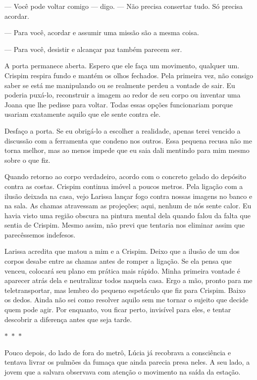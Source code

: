— Você pode voltar comigo — digo. — Não precisa consertar tudo. Só precisa acordar.

— Para você, acordar e assumir uma missão são a mesma coisa.

— Para você, desistir e alcançar paz também parecem ser.

A porta permanece aberta. Espero que ele faça um movimento, qualquer um. Crispim respira fundo e mantém os olhos fechados. Pela primeira vez, não consigo saber se está me manipulando ou se realmente perdeu a vontade de sair. Eu poderia puxá-lo, reconstruir a imagem ao redor de seu corpo ou inventar uma Joana que lhe pedisse para voltar. Todas essas opções funcionariam porque usariam exatamente aquilo que ele sente contra ele.

Desfaço a porta. Se eu obrigá-lo a escolher a realidade, apenas terei vencido a discussão com a ferramenta que condeno nos outros. Essa pequena recusa não me torna melhor, mas ao menos impede que eu saia dali mentindo para mim mesmo sobre o que fiz.

Quando retorno ao corpo verdadeiro, acordo com o concreto gelado do depósito contra as costas. Crispim continua imóvel a poucos metros. Pela ligação com a ilusão deixada na casa, vejo Larissa lançar fogo contra nossas imagens no banco e na sala. As chamas atravessam as projeções; aqui, nenhum de nós sente calor. Eu havia visto uma região obscura na pintura mental dela quando falou da falta que sentia de Crispim. Mesmo assim, não previ que tentaria nos eliminar assim que parecêssemos indefesos.

Larissa acredita que matou a mim e a Crispim. Deixo que a ilusão de um dos corpos desabe entre as chamas antes de romper a ligação. Se ela pensa que venceu, colocará seu plano em prática mais rápido. Minha primeira vontade é aparecer atrás dela e neutralizar todos naquela casa. Ergo a mão, pronto para me teletransportar, mas lembro do pequeno espetáculo que fiz para Crispim. Baixo os dedos. Ainda não sei como resolver aquilo sem me tornar o sujeito que decide quem pode agir. Por enquanto, vou ficar perto, invisível para eles, e tentar descobrir a diferença antes que seja tarde.

\begin{center}
	$\ast$~$\ast$~$\ast$
\end{center}

Pouco depois, do lado de fora do metrô, Lúcia já recobrava a consciência e tentava livrar os pulmões da fumaça que ainda parecia presa neles. A seu lado, a jovem que a salvara observava com atenção o movimento na saída da estação.

